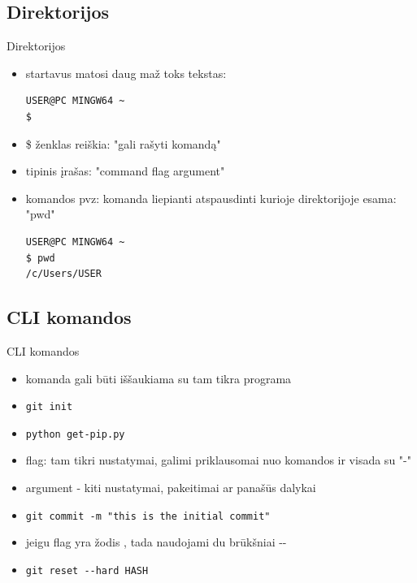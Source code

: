 \documentclass[11pt,xcolor=table]{beamer}
\begin{document}
\subsection{Direktorijos}

\begin{frame}[fragile]{Direktorijos}
\begin{itemize}
\item startavus matosi daug maž toks tekstas:

\begin{lstlisting}
USER@PC MINGW64 ~
$ 
\end{lstlisting}

\item \$ ženklas reiškia: "gali rašyti komandą"
\item tipinis įrašas: "command flag argument"
\item komandos pvz: komanda liepianti atspausdinti kurioje direktorijoje esama: "pwd"

\begin{lstlisting}
USER@PC MINGW64 ~
$ pwd
/c/Users/USER
\end{lstlisting}

\end{itemize}
\end{frame}


\subsection{CLI komandos}
\begin{frame}[fragile]{CLI komandos}
\begin{itemize}
\item komanda gali būti iššaukiama su tam tikra programa
\item \colorbox{listinggray}{\lstinline|git init|}
\item \colorbox{listinggray}{\lstinline|python get-pip.py|}
\item flag: tam tikri nustatymai, galimi priklausomai nuo komandos ir visada su "-"
\item argument - kiti nustatymai, pakeitimai ar panašūs dalykai
\item \colorbox{listinggray}{\lstinline|git commit -m "this is the initial commit"|}
\item jeigu flag yra žodis , tada naudojami du brūkšniai -\/- 
\item \colorbox{listinggray}{\lstinline|git reset --hard HASH|}

\end{itemize}
\end{frame}
\end{document}
